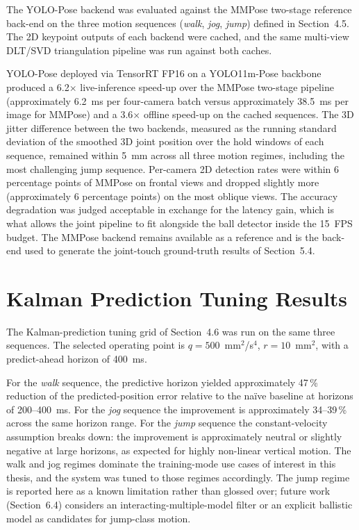 The YOLO-Pose backend was evaluated against the MMPose two-stage reference back-end on the three motion sequences (\textit{walk}, \textit{jog}, \textit{jump}) defined in Section~4.5. The 2D keypoint outputs of each backend were cached, and the same multi-view DLT/SVD triangulation pipeline was run against both caches.

YOLO-Pose deployed via TensorRT FP16 on a YOLO11m-Pose backbone produced a 6.2$\times$ live-inference speed-up over the MMPose two-stage pipeline (approximately 6.2~ms per four-camera batch versus approximately 38.5~ms per image for MMPose) and a 3.6$\times$ offline speed-up on the cached sequences. The 3D jitter difference between the two backends, measured as the running standard deviation of the smoothed 3D joint position over the hold windows of each sequence, remained within 5~mm across all three motion regimes, including the most challenging jump sequence. Per-camera 2D detection rates were within 6 percentage points of MMPose on frontal views and dropped slightly more (approximately 6 percentage points) on the most oblique views. The accuracy degradation was judged acceptable in exchange for the latency gain, which is what allows the joint pipeline to fit alongside the ball detector inside the 15~FPS budget. The MMPose backend remains available as a reference and is the back-end used to generate the joint-touch ground-truth results of Section~5.4.


\section{Kalman Prediction Tuning Results}
\label{sec:5_kalman_tuning}

The Kalman-prediction tuning grid of Section~4.6 was run on the same three sequences. The selected operating point is $q = 500$~mm$^{2}$/s$^{4}$, $r = 10$~mm$^{2}$, with a predict-ahead horizon of 400~ms.

For the \textit{walk} sequence, the predictive horizon yielded approximately 47\,\% reduction of the predicted-position error relative to the na\"{i}ve baseline at horizons of 200--400~ms. For the \textit{jog} sequence the improvement is approximately 34--39\,\% across the same horizon range. For the \textit{jump} sequence the constant-velocity assumption breaks down: the improvement is approximately neutral or slightly negative at large horizons, as expected for highly non-linear vertical motion. The walk and jog regimes dominate the training-mode use cases of interest in this thesis, and the system was tuned to those regimes accordingly. The jump regime is reported here as a known limitation rather than glossed over; future work (Section~6.4) considers an interacting-multiple-model filter or an explicit ballistic model as candidates for jump-class motion.

